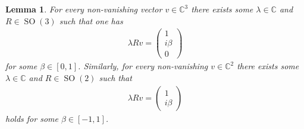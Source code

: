 \documentclass{amsart}
\newtheorem{lemma}[thm]{Lemma}
\newcommand{\C}{\mathbb{C}}
\DeclareMathOperator{\SO}{SO}
\begin{document}
\begin{lemma}
    \label{lin::lemma:existence_of_index_beta_for_lines_in_C3}
        For every non-vanishing vector $v \in \C^3$ there exists some $\lambda \in \C$ and $R \in \SO(3)$ such that one has
        \begin{align*}
            \lambda R v = \begin{pmatrix}
                1 \\ i \beta \\ 0
            \end{pmatrix}
        \end{align*}
        for some $\beta \in [0,1]$. Similarly, for every non-vanishing $v \in \C^2$ there exists some $\lambda \in \C$ and $R \in \SO(2)$ such that
        \begin{align*}
            \lambda R v = \begin{pmatrix}
                1 \\ i \beta
            \end{pmatrix}
        \end{align*}
        holds for some $\beta \in [-1,1]$.
\end{lemma}
\end{document}

